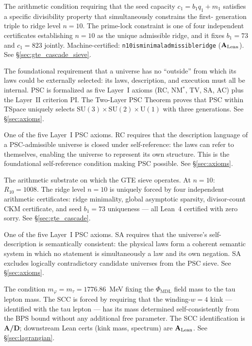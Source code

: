 \documentclass[11pt,openany]{book}
\theoremstyle{remark}
\newcommand{\PHIMDL}{\Phi_{\mathrm{MDL}}}
\newcommand{\lean}[1]{%
  \penalty-100
  \begingroup\def\_{\textunderscore\allowbreak}\texttt{#1}\endgroup}
\newcommand{\CatAL}{\ensuremath{\textbf{A}_{\rm Lean}}}
\newcommand{\CatAD}{\textbf{A/D}}
\begin{document}
\begin{appendices}
\begin{description}[leftmargin=*,font=\bfseries,itemsep=6pt]
\item[Prime-lock constraint]
The arithmetic condition requiring that the seed capacity $c_1 = b_1 q_1 + m_1$
satisfies a specific divisibility property that simultaneously constrains the first-
generation triple to ridge level $n=10$.
The prime-lock constraint is one of four independent certificates establishing
$n=10$ as the unique admissible ridge, and it fixes $b_1=73$ and $c_1=823$ jointly.
Machine-certified: \lean{n10\_is\_minimal\_admissible\_ridge} (\CatAL).
See \S\ref{sec:gte_cascade_sieve}.

\item[PSC --- Perfect Self-Containment]
The foundational requirement that a universe has no ``outside'' from which its laws
could be externally selected: its laws, description, and execution must all be
internal.
PSC is formalized as five Layer~I axioms (RC, NM$^*$, TV, SA, AC) plus the Layer~II
criterion PI.
The Two-Layer PSC Theorem proves that PSC within TSpace uniquely selects
$\mathrm{SU}(3){\times}\mathrm{SU}(2){\times}\mathrm{U}(1)$ with three generations.
See \S\ref{sec:axioms}.

\item[RC --- Reflexive Closure]
One of the five Layer~I PSC axioms.
RC requires that the description language of a PSC-admissible universe is closed
under self-reference: the laws can refer to themselves, enabling the universe to
represent its own structure.
This is the foundational self-reference condition making PSC possible.
See \S\ref{sec:axioms}.

\item[Ridge $R_n = 2^n - 16$]
The arithmetic substrate on which the GTE sieve operates.
At $n=10$: $R_{10} = 1008$.
The ridge level $n=10$ is uniquely forced by four independent arithmetic certificates:
ridge minimality, global asymptotic sparsity, divisor-count CKM certificate, and
seed $b_1=73$ uniqueness — all Lean~4 certified with zero sorry.
See \S\ref{sec:gte_cascade}.

\item[SA --- Semantic Admissibility]
One of the five Layer~I PSC axioms.
SA requires that the universe's self-description is semantically consistent: the
physical laws form a coherent semantic system in which no statement is simultaneously
a law and its own negation.
SA excludes logically contradictory candidate universes from the PSC sieve.
See \S\ref{sec:axioms}.

\item[SCC --- Self-Consistency Condition]
The condition $m_\varphi = m_\tau = 1776.86$~MeV fixing the $\PHIMDL$ field mass to
the tau lepton mass.
The SCC is forced by requiring that the winding-$w{=}4$ kink — identified with the
tau lepton — has its mass determined self-consistently from the BPS bound without any
additional free parameter.
The SCC identification is \CatAD; downstream Lean certs (kink mass, spectrum) are
\CatAL.
See \S\ref{sec:lagrangian}.


\end{description}
\end{appendices}
\end{document}
